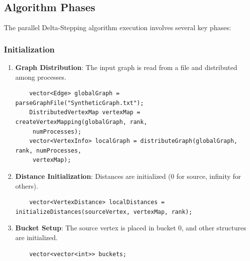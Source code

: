 \documentclass{article}
\begin{document}
\subsection*{Algorithm Phases}

The parallel Delta-Stepping algorithm execution involves several key phases:

\subsubsection*{Initialization}
\begin{enumerate}
    \item \textbf{Graph Distribution}: The input graph is read from a file and distributed among processes.
    \begin{verbatim}
    vector<Edge> globalGraph = parseGraphFile("SyntheticGraph.txt");
    DistributedVertexMap vertexMap = createVertexMapping(globalGraph, rank,
     numProcesses);
    vector<VertexInfo> localGraph = distributeGraph(globalGraph, rank, numProcesses,
     vertexMap);
    \end{verbatim}
    
    \item \textbf{Distance Initialization}: Distances are initialized (0 for source, infinity for others).
    \begin{verbatim}
    vector<VertexDistance> localDistances = initializeDistances(sourceVertex, vertexMap, rank);
    \end{verbatim}
    
    \item \textbf{Bucket Setup}: The source vertex is placed in bucket 0, and other structures are initialized.
    \begin{verbatim}
    vector<vector<int>> buckets;
    \end{verbatim}
\end{enumerate}
\end{document}
